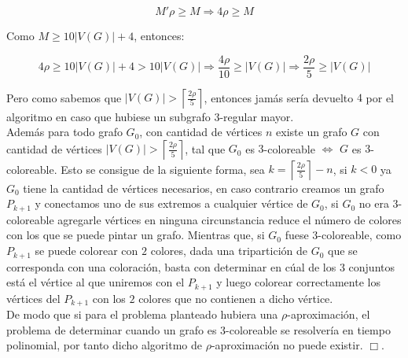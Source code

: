 \documentclass{article}
\begin{document}
$$M'\rho \geq M \Rightarrow 4\rho \geq M$$

Como $M \geq 10|V(G)| + 4$, entonces: 

$$4\rho \geq 10|V(G)| + 4 > 10|V(G)| \Rightarrow \frac{4\rho}{10} \geq |V(G)| \Rightarrow \frac{2\rho}{5} \geq |V(G)|$$

Pero como sabemos que $|V(G)| >  \left\lceil\frac{2\rho}{5} \right\rceil $, entonces jam\'as ser\'ia devuelto $4$ por el algoritmo en caso que hubiese un subgrafo $3$-regular mayor.\\ 

Adem\'as para todo grafo $G_0$, con cantidad de v\'ertices $n$ existe un grafo $G$ con cantidad de v\'ertices $|V(G)| >  \left\lceil\frac{2\rho}{5} \right\rceil $, tal que $G_0$ es $3$-coloreable $\Leftrightarrow$ $G$ es $3$-coloreable. Esto se consigue de la 
siguiente forma, sea $k = \left\lceil\frac{2\rho}{5} \right\rceil - n$, si $k < 0$ ya $G_0$ tiene la cantidad de v\'ertices necesarios, en caso contrario creamos un grafo $P_{k+1}$ y conectamos uno de sus extremos a cualquier v\'ertice de $G_0$, si $G_0$ no era $3$-coloreable 
agregarle v\'ertices en ninguna circunstancia reduce el n\'umero de colores con los que se puede pintar un grafo. Mientras que, si $G_0$ fuese $3$-coloreable, como $P_{k+1}$ se puede colorear con $2$ colores, dada una tripartici\'on de $G_0$ que se corresponda con una coloraci\'on, basta con determinar en 
c\'ual de los $3$ conjuntos est\'a el v\'ertice al que uniremos con el $P_{k+1}$ y luego colorear correctamente los v\'ertices del $P_{k+1}$ con los $2$ colores que no contienen a dicho v\'ertice.\\ 

De modo que si para el problema planteado hubiera una $\rho$-aproximaci\'on, el problema de determinar cuando un grafo es $3$-coloreable se resolver\'ia en tiempo polinomial, por tanto dicho algoritmo de $\rho$-aproximaci\'on no 
puede existir. $\Box $.
\end{document}
